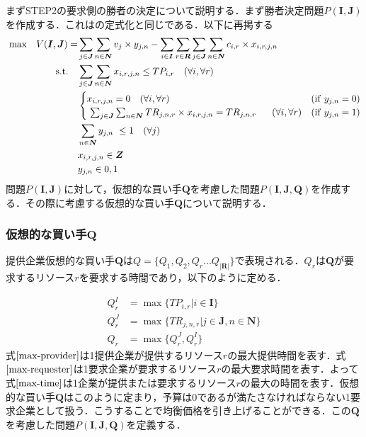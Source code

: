まずSTEP2の要求側の勝者の決定について説明する．まず勝者決定問題\(P(\boldsymbol{I},\boldsymbol{J})\)を作成する．これはの定式化と同じである．以下に再掲する
\begin{align}  
{\rm max}\quad  V(\boldsymbol{I},\boldsymbol{J})=&\sum_{j\in \boldsymbol{J}}\sum_{n\in\boldsymbol{N}}v_{j} \times y_{j,n} - \sum_{i\in\boldsymbol{I}}\sum_{r\in\boldsymbol{R}}\sum_{j\in\boldsymbol{J}}\sum_{n\in\boldsymbol{N}}c_{i,r} \times x_{i,r,j,n} \label{2-pij-obj}\\  
{\rm s.t.} \quad &\sum_{j\in \boldsymbol{J}}\sum_{n\in\boldsymbol{N}}x_{i,r,j,n} \leq TP_{i,r} \quad (\forall i, \forall r)\label{2-subto-time}\\
&\begin{cases} x_{i,r,j,n} = 0 \quad (\forall i, \forall r)&({\rm if} \ y_{j,n}=0) \\  
\sum_{j \in \boldsymbol{J}}\sum_{n\in\boldsymbol{N}} TR_{j,n,r} \times x_{i,r,j,n} = TR_{j,n,r}    \quad  (\forall i, \forall r)&({\rm if} \ y_{j,n}=1) \end{cases}\\ 
&\sum_{n\in \boldsymbol{N}}y_{j,n}  \leq 1 \quad (\forall j)\\   &x_{i,r,j,n} \in \boldsymbol{Z}\\    
&y_{j,n} \in {0,1}
\end{align}
問題\(P(\boldsymbol{I},\boldsymbol{J})\)に対して，仮想的な買い手\(\boldsymbol{Q}\)を考慮した問題\(P(\boldsymbol{I},\boldsymbol{J},\boldsymbol{Q})\)を作成する．その際に考慮する仮想的な買い手\(\boldsymbol{Q}\)について説明する．

\hypertarget{ux4eeeux60f3ux7684ux306aux8cb7ux3044ux624bboldsymbolq}{%
\subsubsection{\texorpdfstring{仮想的な買い手\(\boldsymbol{Q}\)}{仮想的な買い手\textbackslash boldsymbol\{Q\}}}\label{ux4eeeux60f3ux7684ux306aux8cb7ux3044ux624bboldsymbolq}}

提供企業仮想的な買い手\(\boldsymbol{Q}\)は\(Q=\{Q_1,Q_2,Q_r…Q_{|\boldsymbol{R}|}\}\)で表現される．\(Q_r\)は\(\boldsymbol{Q}\)が要求するリソース\(r\)を要求する時間であり，以下のように定める\cite{Chu2009}．

\begin{align}
Q_r^I&=\max \{TP_{i,r} |i \in \boldsymbol{I}\} \label{max-provider}\\
Q_r^J&=\max \{TR_{j,n,r} |j \in \boldsymbol{J},n \in \boldsymbol{N}\} \label{max-requester}\\
Q_r&=\max \{Q_r^J,Q_r^I\} \label{max-time}
\end{align}
式\(\eqref{max-provider}\)は1提供企業が提供するリソース\(r\)の最大提供時間を表す．式\(\eqref{max-requester}\)は1要求企業が要求するリソース\(r\)の最大要求時間を表す．よって式\(\eqref{max-time}\)は1企業が提供または要求するリソース\(r\)の最大の時間を表す．仮想的な買い手\(\boldsymbol{Q}\)はこのように定まり，予算は0であるが満たさなければならない1要求企業として扱う．こうすることで均衡価格を引き上げることができる．この\(\boldsymbol{Q}\)を考慮した問題\(P(\boldsymbol{I},\boldsymbol{J},\boldsymbol{Q})\)を定義する．

